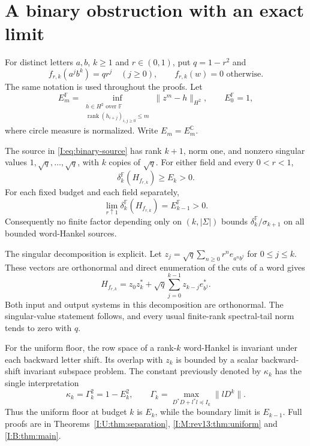 \section{A binary obstruction with an exact limit}
For distinct letters $a,b$, $k\ge1$ and $r\in(0,1)$, put $q=1-r^2$ and
\begin{equation}\label{I:eq:binary-source}
 f_{r,k}(a^j b^k)=qr^j\quad(j\ge0),\qquad
 f_{r,k}(w)=0\text{ otherwise}.
\end{equation}
The same notation is used throughout the proofs. Let
\[
 E_m^{\mathbb F}=\inf_{\substack{h\in H^2\text{ over }\mathbb F\\
                 \operatorname{rank}(h_{i+j})_{i,j\ge0}\le m}}
                 \|z^m-h\|_{H^2},\qquad E_0^{\mathbb F}=1,
\]
where circle measure is normalized. Write $E_m=E_m^{\mathbb C}$.

\begin{theorem}
\label{I:I:main:separation}
The source in \eqref{I:eq:binary-source} has rank $k+1$, norm one, and nonzero
singular values $1,\sqrt q,\ldots,\sqrt q$, with $k$ copies of $\sqrt q$.
For either field and every $0<r<1$,
\[
 \delta_k^{\mathbb F}(H_{f_{r,k}})\ge E_k>0.
\]
For each fixed budget and each field separately,
\[
 \lim_{r\uparrow1}\delta_k^{\mathbb F}(H_{f_{r,k}})=E_{k-1}^{\mathbb F}>0.
\]
Consequently no finite factor depending only on $(k,|\Sigma|)$ bounds
$\delta_k^{\mathbb F}/\sigma_{k+1}$ on all bounded word-Hankel sources.
\end{theorem}

The singular decomposition is explicit. Let
$z_j=\sqrt q\sum_{n\ge0}r^ne_{a^nb^j}$ for $0\le j\le k$.
These vectors are orthonormal and direct enumeration of the cuts of a word gives
\[
 H_{f_{r,k}}=z_0z_k^*+\sqrt q\sum_{j=0}^{k-1}z_{k-j}e_{b^j}^*.
\]
Both input and output systems in this decomposition are orthonormal.
The singular-value statement follows, and every usual finite-rank
spectral-tail norm tends to zero with $q$.

For the uniform floor, the row space of a rank-$k$ word-Hankel is
invariant under each backward letter shift. Its overlap with $z_k$ is
bounded by a scalar backward-shift invariant subspace problem. The
constant previously denoted by $\kappa_k$ has the single interpretation
\[
 \kappa_k=\Gamma_k^2=1-E_k^2,
 \qquad
 \Gamma_k=\max_{D^*D+l^*l\preceq I_k}\|lD^k\|.
\]
Thus the uniform floor at budget $k$ is $E_k$, while the boundary
limit is $E_{k-1}$. Full proofs are in
Theorems~\ref{I:U:thm:separation}, \ref{I:M:rev13:thm:uniform} and
\ref{I:B:thm:main}.

